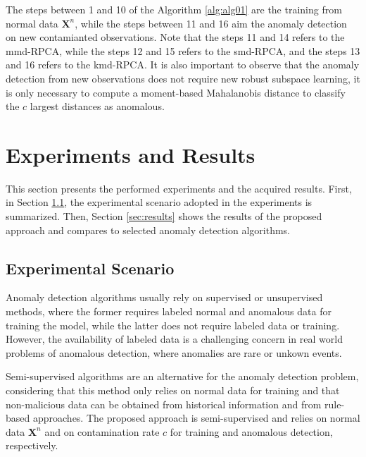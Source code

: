 \documentclass[review]{elsarticle}
\begin{document}
The steps between 1 and 10 of the Algorithm \ref{alg:alg01} are the training from normal data $\boldsymbol{X}^n$, while the steps between 11 and 16 aim the anomaly detection on new contamianted observations. Note that the steps 11 and 14 refers to the mmd-RPCA, while the steps 12 and 15 refers to the smd-RPCA, and the steps 13 and 16 refers to the kmd-RPCA. It is also important to observe that the anomaly detection from new observations does not require new robust subspace learning, it is only necessary to compute a moment-based Mahalanobis distance to classify the $c$ largest distances as anomalous.

\section{Experiments and Results}
\label{sec:experimentalresults}

This section presents the performed experiments and the acquired results. First, in Section \ref{sec:AnalyzedScenario}, the experimental scenario adopted in the experiments is summarized. Then, Section \ref{sec:results} shows the results of the proposed approach and compares to selected anomaly detection algorithms.

\subsection{Experimental Scenario}
\label{sec:AnalyzedScenario}

Anomaly detection algorithms usually rely on supervised or unsupervised methods, where the former requires labeled normal and anomalous data for training the model, while the latter does not require labeled data or training. However, the availability of labeled data is a challenging concern in real world problems of anomalous detection, where anomalies are rare or unkown events. 

Semi-supervised algorithms are an alternative for the anomaly detection problem, considering that this method only relies on normal data for training and that non-malicious data can be obtained from historical information and from rule-based approaches. The proposed approach is semi-supervised and relies on normal data $\boldsymbol{X}^n$ and on contamination rate $c$ for training and anomalous detection, respectively.
\end{document}
